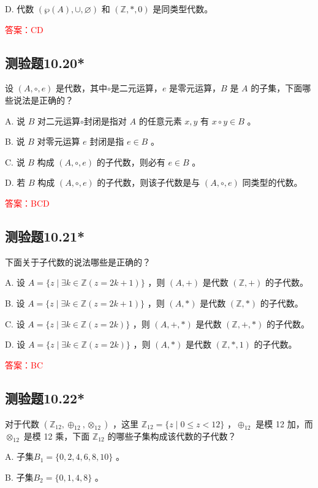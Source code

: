 \documentclass[UTF8, heading=true]{ctexart}
\begin{document}
D. 代数 $(\wp(A), \cup, \varnothing)$ 和 $(\mathbb{Z}, *, 0)$ 是同类型代数。

\textcolor{red}{答案：CD}

\subsection{测验题10.20*}

设 $(A, \circ, e)$ 是代数，其中$\circ$是二元运算，$e$ 是零元运算，$B$ 是 $A$ 的子集，下面哪些说法是正确的？

A. 说 $B$ 对二元运算$\circ$封闭是指对 $A$ 的任意元素 $x, y$ 有 $x \circ y \in B$ 。

B. 说 $B$ 对零元运算 $e$ 封闭是指 $e \in B$ 。

C. 说 $B$ 构成 $(A, \circ, e)$ 的子代数，则必有 $e \in B$ 。

D. 若 $B$ 构成 $(A, \circ, e)$ 的子代数，则该子代数是与 $(A, \circ, e)$ 同类型的代数。

\textcolor{red}{答案：BCD}

\subsection{测验题10.21*}

下面关于子代数的说法哪些是正确的？

A. 设 $A=\{z \mid \exists k \in \mathbb{Z}(z=2 k+1)\}$ ，则 $(A,+)$ 是代数 $(\mathbb{Z},+)$ 的子代数。

B. 设 $A=\{z \mid \exists k \in \mathbb{Z}(z=2 k+1)\}$ ，则 $(A, *)$ 是代数 $(\mathbb{Z}, *)$ 的子代数。

C. 设 $A=\{z \mid \exists k \in \mathbb{Z}(z=2 k)\}$ ，则 $(A,+, *)$ 是代数 $(\mathbb{Z},+, *)$ 的子代数。

D. 设 $A=\{z \mid \exists k \in \mathbb{Z}(z=2 k)\}$ ，则 $(A, *)$ 是代数 $(\mathbb{Z}, *, 1)$ 的子代数。

\textcolor{red}{答案：BC}

\subsection{测验题10.22*}

对于代数 $\left(\mathbb{Z}_{12}, \oplus_{12}, \otimes_{12}\right)$ ，这里 $\mathbb{Z}_{12}=\{z \mid 0 \leq z<12\}$ ，$\oplus_{12}$ 是模 12 加，而 $\otimes_{12}$ 是模 12 乘，下面 $\mathbb{Z}_{12}$ 的哪些子集构成该代数的子代数？

A. 子集$B_1 = \{0,2,4,6,8,10\}$ 。

B. 子集$B_2 = \{0,1,4,8\}$ 。
\end{document}
